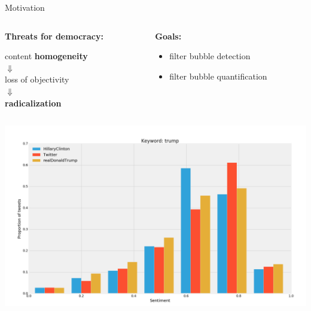 \documentclass{beamer}
\begin{document}
\begin{frame}[fragile]
\begin{columns}[T]
\begin{column}{.63\textwidth}
\begin{customalertblock}{Motivation}
    \begin{columns}
        \begin{column}{.5\textwidth}
            \begin{large}\textbf{Threats for democracy:}\end{large}
            \vspace{0.5cm}
            \center
            content \textbf{homogeneity}\\
            $\Downarrow$\\
            loss of objectivity\\
            $\Downarrow$\\
            \textbf{radicalization}
        \end{column}
        \begin{column}{.5\textwidth}
            \begin{large}\textbf{Goals:}\end{large}
            \vspace{0.5cm}
            \begin{itemize}
                \item filter bubble detection
                \item filter bubble quantification
            \end{itemize}
        \end{column}
    \end{columns}
\end{customalertblock}
\begin{columns}
        \includegraphics[scale=0.585]{./Pics/hist-trump.png}

\end{columns}
\end{column}
\end{columns}
\end{frame}
\end{document}
